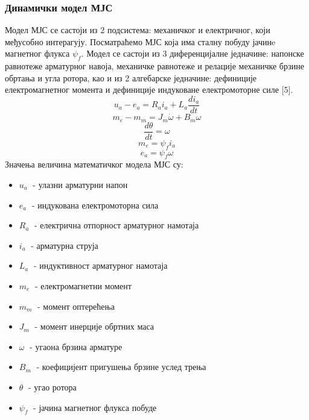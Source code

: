 \documentclass[12pt]{article}
\begin{document}
\subsubsection{Динамички модел МЈС}
Модел МЈС се састоји из 2 подсистема: механичког и електричног, који међусобно интерагују. Посматраћемо МЈС која има сталну побуду јачинe магнетног флукса $\psi _f$. Модел се састоји из 3 диференцијалне једначине: напонске равнотеже арматурног навоја, механичке равнотеже и релације механичке брзине обртања и угла ротора, као и из 2 алгебарске једначине: дефиниције електромагнетног момента и дефиниције индуковане електромоторне силе [5].
\begin{equation}
    u_a-e_a=R_ai_a+L_a\dfrac{di_a}{dt}
\end{equation}
\begin{equation}
    m_e-m_m=J_m \dot\omega+B_m\omega
\end{equation}
\begin{equation}
    \dfrac{d\theta}{dt}=\omega
\end{equation}
\begin{equation}
    m_e=\psi _fi_a
\end{equation}
\begin{equation}
    e_a=\psi _f\omega
\end{equation}
Значења величина математичког модела МЈС су:
\begin{itemize}
    \item $u_a\;$ - улазни арматурни напон
    \item $e_a\;$ - индукована електромоторна сила
    \item $R_a\;$ - електрична отпорност арматурног намотаја
    \item $i_a\;$ - арматурна струја
    \item $L_a\;$ - индуктивност арматурног намотаја
    \item $m_e\;$ - електромагнетни момент
    \item $m_m\;$ - момент оптерећења
    \item $J_m\;$ - момент инерције обртних маса
    \item $\omega\;$ - угаона брзина арматуре
    \item $B_m\;$ - коефицијент пригушења брзине услед трења
    \item $\theta\;$ - угао ротора
    \item $\psi _f\;$ - јачина магнетног флукса побуде
\end{itemize}
\end{document}
